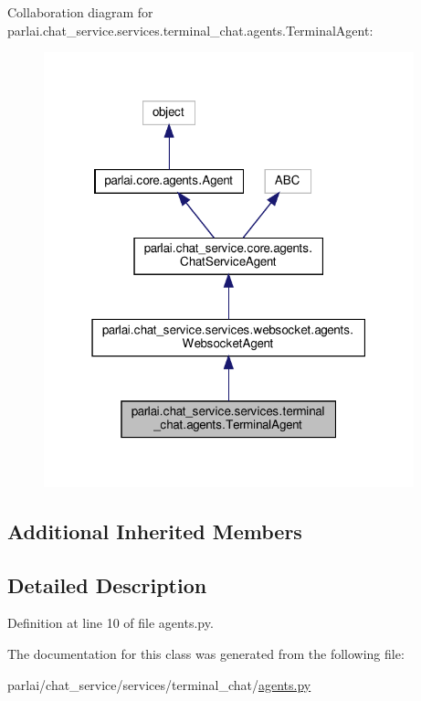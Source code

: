 Collaboration diagram for parlai.\+chat\+\_\+service.\+services.\+terminal\+\_\+chat.\+agents.\+Terminal\+Agent\+:\nopagebreak
\begin{figure}[H]
\begin{center}
\leavevmode
\includegraphics[width=304pt]{d0/deb/classparlai_1_1chat__service_1_1services_1_1terminal__chat_1_1agents_1_1TerminalAgent__coll__graph}
\end{center}
\end{figure}
\subsection*{Additional Inherited Members}


\subsection{Detailed Description}


Definition at line 10 of file agents.\+py.



The documentation for this class was generated from the following file\+:\begin{DoxyCompactItemize}
\item 
parlai/chat\+\_\+service/services/terminal\+\_\+chat/\hyperlink{parlai_2chat__service_2services_2terminal__chat_2agents_8py}{agents.\+py}\end{DoxyCompactItemize}
